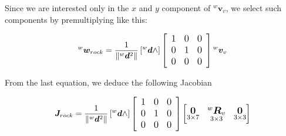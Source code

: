 \documentclass{article}
\begin{document}
\noindent
Since we are interested only in the $x$ and $y$ component of ${^w}{\boldsymbol v_{v}}$, we select such components by premultiplying like this:

\begin{equation}
\large
{^w}\boldsymbol w_{rock}=\frac{1}{\left\|{^w} \boldsymbol d^{2}\right\|}\left[{^w}{\boldsymbol d} \wedge\right]\left[\begin{array}{lll}
1 & 0 & 0 \\
0 & 1 & 0 \\
0 & 0 & 0
\end{array}\right] {^w}{\boldsymbol v_{v}}
\end{equation}



From the last equation, we deduce the following Jacobian

\begin{equation}
\large
{\boldsymbol J_{rock}} =
\frac{1}{\left\|{^w} \boldsymbol d^{2}\right\|}\left[{^w}{\boldsymbol d} \wedge\right]\left[\begin{array}{lll}
1 & 0 & 0 \\
0 & 1 & 0 \\
0 & 0 & 0
\end{array}\right]
    \begin{bmatrix}
     \underset{3\times 7}{\boldsymbol{0}} & \underset{ 3\times 3}{^{w}\boldsymbol{R}_{v}} & \underset{3\times 3}{\boldsymbol{0}} \\
    \end{bmatrix}
\end{equation}
\end{document}
